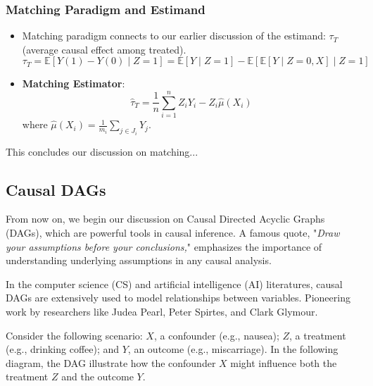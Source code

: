 \subsubsection{Matching Paradigm and Estimand}
\begin{itemize}
    \item Matching paradigm connects to our earlier discussion of the estimand: $\tau_T$ (average causal effect among treated).
    \[
    \tau_T = \mathbb{E}[Y(1) - Y(0) \mid Z = 1] = \mathbb{E}[Y \mid Z = 1] - \mathbb{E}[\mathbb{E}[Y \mid Z = 0, X] \mid Z = 1]
    \]
    \item \textbf{Matching Estimator}:
    \[
    \hat{\tau}_T = \frac{1}{n} \sum_{i=1}^{n} Z_i Y_i - Z_i \hat{\mu}(X_i)
    \]
    where $\hat{\mu}(X_i) = \frac{1}{m_i} \sum_{j \in J_i} Y_j$.

\end{itemize}
This concludes our discussion on matching...

\subsection{Causal DAGs}

From now on, we begin our discussion on Causal Directed Acyclic Graphs (DAGs), which are powerful tools in causal inference. A famous quote, "\textit{Draw your assumptions before your conclusions,}" emphasizes the importance of understanding underlying assumptions in any causal analysis. 

In the computer science (CS) and artificial intelligence (AI) literatures, causal DAGs are extensively used to model relationships between variables. Pioneering work by researchers like Judea Pearl, Peter Spirtes, and Clark Glymour. 

\begin{example}
    Consider the following scenario: $X$, a confounder (e.g., nausea); $Z$, a treatment (e.g., drinking coffee); and $Y$, an outcome (e.g., miscarriage). In the following diagram, the DAG illustrate how the confounder $X$ might influence both the treatment $Z$ and the outcome $Y$. 

\begin{center}
\end{center}
\end{example}


